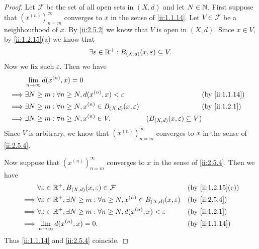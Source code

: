 \begin{proof}
  Let \(\mathcal{F}\) be the set of all open sets in \((X, d)\) and let \(N \in \mathbb{N}\).
  First suppose that \((x^{(n)})_{n = m}^\infty\) converges to \(x\) in the sense of \cref{ii:1.1.14}.
  Let \(V \in \mathcal{F}\) be a neighbourhood of \(x\).
  By \cref{ii:2.5.2} we know that \(V\) is open in \((X, d)\).
  Since \(x \in V\), by \cref{ii:1.2.15}(a) we know that
  \[
    \exists \varepsilon \in \mathbb{R}^+ : B_{(X, d)}(x, \varepsilon) \subseteq V.
  \]
  Now we fix such \(\varepsilon\).
  Then we have
  \begin{align*}
             & \lim_{n \to \infty} d(x^{(n)}, x) = 0                                                                                                \\
    \implies & \exists N \geq m : \forall n \geq N, d(x^{(n)}, x) < \varepsilon            &                                          & \by{ii:1.1.14} \\
    \implies & \exists N \geq m : \forall n \geq N, x^{(n)} \in B_{(X, d)}(x, \varepsilon) &                                          & \by{ii:1.2.1}  \\
    \implies & \exists N \geq m : \forall n \geq N, x^{(n)} \in V.                         & (B_{(X, d)}(x, \varepsilon) \subseteq V)
  \end{align*}
  Since \(V\) is arbitrary, we know that \((x^{(n)})_{n = m}^\infty\) converges to \(x\) in the sense of \cref{ii:2.5.4}.

  Now suppose that \((x^{(n)})_{n = m}^\infty\) converges to \(x\) in the sense of \cref{ii:2.5.4}.
  Then we have
  \begin{align*}
             & \forall \varepsilon \in \R^+, B_{(X, d)}(x, \varepsilon) \in \mathcal{F}                                  &  & \by{ii:1.2.15}[c] \\
    \implies & \forall \varepsilon \in \R^+, \exists N \geq m : \forall n \geq N, x^{(n)} \in B_{(X, d)}(x, \varepsilon) &  & \by{ii:2.5.4}     \\
    \implies & \forall \varepsilon \in \R^+, \exists N \geq m : \forall n \geq N, d(x^{(n)}, x) < \varepsilon            &  & \by{ii:1.2.1}     \\
    \implies & \lim_{n \to \infty} d(x^{(n)}, x) = 0.                                                                    &  & \by{ii:1.1.14}
  \end{align*}
  Thus \cref{ii:1.1.14} and \cref{ii:2.5.4} coincide.
\end{proof}

